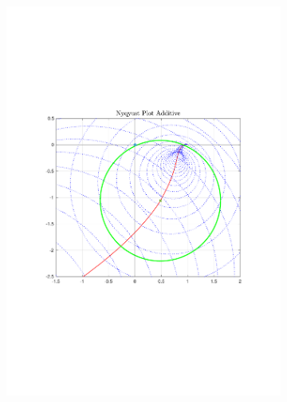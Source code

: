 \documentclass[a4paper, 12pt]{article}
\begin{document}
\begin{figure}[h!]{}
    \begin{subfigure}[t]{0.32\textwidth}
           \includegraphics[width=\textwidth]{Figures/fig10a.pdf}
           \label{fig:fig10a}
    \end{subfigure}
    \begin{subfigure}[t]{0.32\textwidth}

\end{subfigure}
\end{figure}
\end{document}
